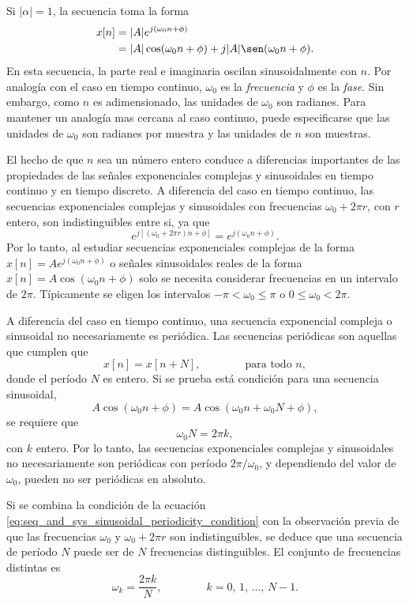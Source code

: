 \documentclass[a4paper]{report}
\begin{document}
\begin{itemize}
 Si \(|\alpha|=1\), la secuencia toma la forma
 \begin{align*}
  x[n]&=|A|e^{j(\omega_0n+\phi)}\\
   &=|A|\cos(\omega_0n+\phi)+j|A|\sen(\omega_0n+\phi). 
 \end{align*}
 En esta secuencia, la parte real e imaginaria oscilan sinusoidalmente con \(n\). Por analogía con el caso en tiempo continuo, \(\omega_0\) es la \emph{frecuencia} y \(\phi\) es la \emph{fase}. Sin embargo, como \(n\) es adimensionado, las unidades de \(\omega_0\) son radianes. Para mantener un analogía mas cercana al caso continuo, puede especificarse que las unidades de \(\omega_0\) son radianes por muestra y las unidades de \(n\) son muestras.
 
 El hecho de que \(n\) sea un número entero conduce a diferencias importantes de las propiedades de las señales exponenciales complejas y sinusoidales en tiempo continuo y en tiempo discreto. A diferencia del caso en tiempo continuo, las secuencias exponenciales complejas y sinusoidales con frecuencias \(\omega_0+2\pi r\), con \(r\) entero, son indistinguibles entre si, ya que 
 \[
  e^{j[(\omega_0+2\pi r)n+\phi]}=e^{j(\omega_0n+\phi)}.
 \]
 Por lo tanto, al estudiar secuencias exponenciales complejas de la forma \(x[n]=Ae^{j(\omega_0n+\phi)}\) o señales sinusoidales reales de la forma \(x[n]=A\cos(\omega_0n+\phi)\) solo se necesita considerar frecuencias en un intervalo de \(2\pi\). Típicamente se eligen los intervalos \(-\pi<\omega_0\leq\pi\) o \(0\leq\omega_0<2\pi\).

 A diferencia del caso en tiempo continuo, una secuencia exponencial compleja o sinusoidal no necesariamente es periódica. Las secuencias periódicas son aquellas que cumplen que 
 \[
  x[n]=x[n+N],
  \qquad\qquad\textrm{para todo }n,
 \]
 donde el período \(N\) es entero. Si se prueba está condición para una secuencia sinusoidal,
 \[
  A\cos(\omega_0n+\phi)=A\cos(\omega_0n+\omega_0N+\phi),
 \]
 se requiere que
 \begin{equation}\label{eq:seq_and_sys_sinusoidal_periodicity_condition}
  \omega_0N=2\pi k,  
 \end{equation}
 con \(k\) entero. Por lo tanto, las secuencias exponenciales complejas y sinusoidales no necesariamente son periódicas con período \(2\pi/\omega_0\), y dependiendo del valor de \(\omega_0\), pueden no ser periódicas en absoluto.
 
 Si se combina la condición de la ecuación \ref{eq:seq_and_sys_sinusoidal_periodicity_condition} con la observación previa de que las frecuencias \(\omega_0\) y \(\omega_0+2\pi r\) son indistinguibles, se deduce que una secuencia de período \(N\) puede ser de \(N\) frecuencias distinguibles. El conjunto de frecuencias distintas es
 \[
  \omega_k=\frac{2\pi k}{N},
  \qquad\qquad
  k=0,\,1,\,\dots,\,N-1. 
 \]
 

\end{itemize}
\end{document}
